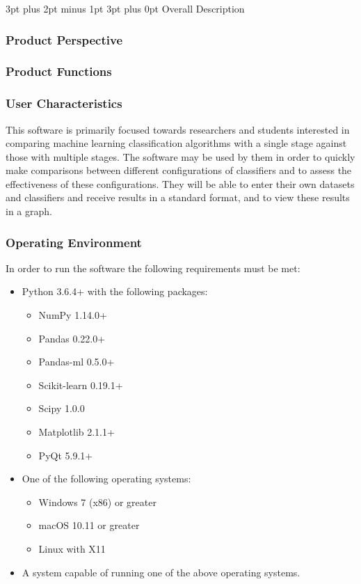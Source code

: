 \documentclass[12pt,a4paper]{article}
\makeatletter
\renewcommand\subsection{\@startsection {subsection}{1}{2mm} %
      {3pt plus 2pt minus 1pt} %
      {3pt plus 0pt} %
      {\normalfont\bfseries}}
\makeatother
\begin{document}
\subsection{Overall Description}
\subsubsection{Product Perspective}
\subsubsection{Product Functions}
\subsubsection{User Characteristics}
This software is primarily focused towards researchers and students interested in comparing machine learning classification algorithms with a single stage against those with multiple stages. The software may be used by them in order to quickly make comparisons between different configurations of classifiers and to assess the effectiveness of these configurations. They will be able to enter their own datasets and classifiers and receive results in a standard format, and to view these results in a graph.
\subsubsection{Operating Environment}
In order to run the software the following requirements must be met:
\begin{itemize}
	\item{Python 3.6.4+ with the following packages:}
	\begin{itemize}
		\item{NumPy 1.14.0+}
		\item{Pandas 0.22.0+}
		\item{Pandas-ml 0.5.0+}
		\item{Scikit-learn 0.19.1+}
		\item{Scipy 1.0.0}
		\item{Matplotlib 2.1.1+}
		\item{PyQt 5.9.1+}
	\end{itemize}
\item{One of the following operating systems:}
	\begin{itemize}
		\item{Windows 7 (x86) or greater}
		\item{macOS 10.11 or greater}
		\item{Linux with X11}
	\end{itemize}
	\item{A system capable of running one of the above operating systems.}
\end{itemize}
\end{document}
